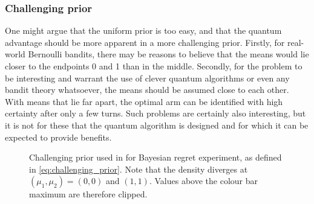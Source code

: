 \pagebreak\clearpage


\subsubsection{Challenging prior}
One might argue that the uniform prior is too easy, and that the quantum advantage should be more apparent in a more challenging prior.
Firstly, for real-world Bernoulli bandits, there may be reasons to believe that the means would lie closer to the endpoints 0 and 1 than in the middle.
Secondly, for the problem to be interesting and warrant the use of clever quantum algorithms or even any bandit theory whatsoever, the means should be assumed close to each other.
With means that lie far apart, the optimal arm can be identified with high certainty after only a few turns.
Such problems are certainly also interesting, but it is not for these that the quantum algorithm is designed and for which it can be expected to provide benefits.

\begin{figure}[p]
    \centering
    \caption[
        Challenging prior used in Bayesian regret experiment.
    ]
    {
        Challenging prior used in for Bayesian regret experiment, as defined in \cref{eq:challenging_prior}.
        Note that the density diverges at $(\mu_1, \mu_2) = (0, 0)$ and $(1, 1)$.
        Values above the colour bar maximum are therefore clipped.
    }
    \label{fig:prior1}
\end{figure}

